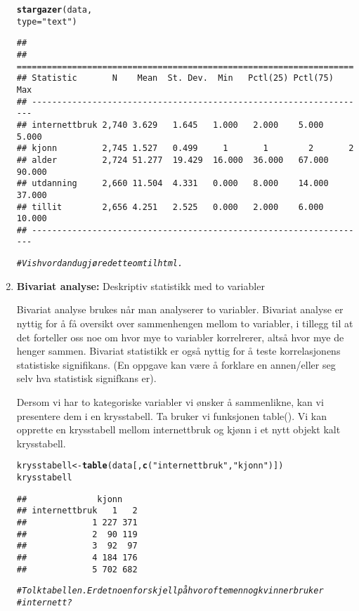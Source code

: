 \documentclass[a4 paper, 12pt]{article}\usepackage[]{graphicx}\usepackage[]{color}
\makeatletter
\newcommand{\hlstr}[1]{\textcolor[rgb]{0.192,0.494,0.8}{#1}}%
\newcommand{\hlcom}[1]{\textcolor[rgb]{0.678,0.584,0.686}{\textit{#1}}}%
\newcommand{\hlstd}[1]{\textcolor[rgb]{0.345,0.345,0.345}{#1}}%
\newcommand{\hlkwb}[1]{\textcolor[rgb]{0.69,0.353,0.396}{#1}}%
\newcommand{\hlkwc}[1]{\textcolor[rgb]{0.333,0.667,0.333}{#1}}%
\newcommand{\hlkwd}[1]{\textcolor[rgb]{0.737,0.353,0.396}{\textbf{#1}}}%
\newenvironment{kframe}{%
 \def\at@end@of@kframe{}%
 \ifinner\ifhmode%
  \def\at@end@of@kframe{\end{minipage}}%
  \begin{minipage}{\columnwidth}%
 \fi\fi%
 \def\FrameCommand##1{\hskip\@totalleftmargin \hskip-\fboxsep
 \colorbox{shadecolor}{##1}\hskip-\fboxsep
     \hskip-\linewidth \hskip-\@totalleftmargin \hskip\columnwidth}%
 \MakeFramed {\advance\hsize-\width
   \@totalleftmargin\z@ \linewidth\hsize
   \@setminipage}}%
 {\par\unskip\endMakeFramed%
 \at@end@of@kframe}
\newenvironment{knitrout}{}{} %
\makeatother
\begin{document}
\begin{enumerate}
\begin{knitrout}
\begin{kframe}
\begin{alltt}
\hlkwd{stargazer}\hlstd{(data,}
          \hlkwc{type} \hlstd{=} \hlstr{"text"}\hlstd{)}
\end{alltt}
\begin{verbatim}
## 
## ===================================================================
## Statistic       N    Mean  St. Dev.  Min   Pctl(25) Pctl(75)  Max  
## -------------------------------------------------------------------
## internettbruk 2,740 3.629   1.645   1.000   2.000    5.000   5.000 
## kjonn         2,745 1.527   0.499     1       1        2       2   
## alder         2,724 51.277  19.429  16.000  36.000   67.000  90.000
## utdanning     2,660 11.504  4.331   0.000   8.000    14.000  37.000
## tillit        2,656 4.251   2.525   0.000   2.000    6.000   10.000
## -------------------------------------------------------------------
\end{verbatim}
\begin{alltt}
\hlcom{# Vis hvordan du gjøre dette om til html.}
\end{alltt}
\end{kframe}
\end{knitrout}
         
         \item \textbf{Bivariat analyse:} Deskriptiv statistikk med to variabler 
       
       Bivariat analyse brukes når man analyserer to variabler. Bivariat analyse er nyttig for å få oversikt over sammenhengen mellom to variabler, i tillegg til at det forteller oss noe om hvor mye to variabler korrelrerer, altså hvor mye de henger sammen. Bivariat statistikk er også nyttig for å teste korrelasjonens statistiske signifikans. (En oppgave kan være å forklare en annen/eller seg selv hva statistisk signifkans er). 
       
       Dersom vi har to kategoriske variabler vi ønsker å sammenlikne, kan vi presentere dem i en krysstabell. Ta bruker vi funksjonen table(). Vi kan opprette en krysstabell mellom  internettbruk og kjønn i et nytt objekt kalt krysstabell.
       
\begin{knitrout}\footnotesize
{}\color{fgcolor}\begin{kframe}
\begin{alltt}
  \hlstd{krysstabell} \hlkwb{<-} \hlkwd{table}\hlstd{(data[,} \hlkwd{c}\hlstd{(}\hlstr{"internettbruk"}\hlstd{,} \hlstr{"kjonn"}\hlstd{)])}
\hlstd{krysstabell}
\end{alltt}
\begin{verbatim}
##              kjonn
## internettbruk   1   2
##             1 227 371
##             2  90 119
##             3  92  97
##             4 184 176
##             5 702 682
\end{verbatim}
\begin{alltt}
\hlcom{# Tolk tabellen. Er det noen forskjell på hvor ofte menn og kvinner bruker }
\hlcom{# internett?}
\end{alltt}
\end{kframe}
\end{knitrout}
         

\end{enumerate}
\end{document}
